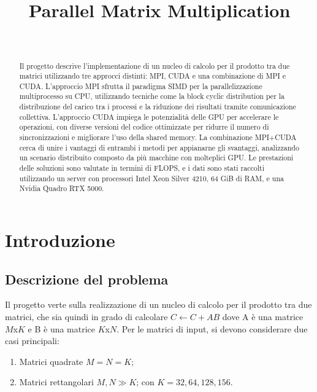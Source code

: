 \documentclass[conference]{IEEEtran}
\begin{document}
\title{Parallel Matrix Multiplication\\
}

\author{
\and
{}
\\
}

\thispagestyle{plain}
\pagestyle{plain}

\maketitle

\begin{abstract}
Il progetto descrive l'implementazione di un nucleo di calcolo per il prodotto tra due matrici utilizzando tre approcci distinti: MPI, CUDA e una combinazione di MPI e CUDA. L'approccio MPI sfrutta il paradigma SIMD per la parallelizzazione multiprocesso su CPU, utilizzando tecniche come la block cyclic distribution per la distribuzione del carico tra i processi e la riduzione dei risultati tramite comunicazione collettiva. L'approccio CUDA impiega le potenzialità delle GPU per accelerare le operazioni, con diverse versioni del codice ottimizzate per ridurre il numero di sincronizzazioni e migliorare l'uso della shared memory. La combinazione MPI+CUDA cerca di unire i vantaggi di entrambi i metodi per appianarne gli svantaggi, analizzando un scenario distribuito composto da più macchine con molteplici GPU. Le prestazioni delle soluzioni sono valutate in termini di FLOPS, e i dati sono stati raccolti utilizzando un server con processori Intel Xeon Silver 4210, 64 GiB di RAM, e una Nvidia Quadro RTX 5000.
\end{abstract}

\section{Introduzione}
\subsection{Descrizione del problema}
Il progetto verte sulla realizzazione di un nucleo di calcolo per il prodotto tra due matrici, che sia quindi in grado di calcolare
$C \leftarrow C + AB$
dove A è una matrice $M$x$K$ e B è una matrice $K$x$N$. Per le matrici di input, si devono considerare due casi principali:
\begin{enumerate}
    \item Matrici quadrate $M = N = K$;
    \item Matrici rettangolari $M, N \gg K$; con $K = 32, 64, 128, 156$.
\end{enumerate}
\end{document}
